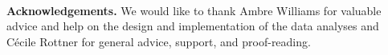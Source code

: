 \documentclass[runningheads]{llncs}
\begin{document}
\paragraph{}
\noindent\footnotesize{\textbf{Acknowledgements.}}
We would like to thank Ambre Williams for valuable advice and help on the design and implementation of the data analyses and C\'ecile Rottner for general advice, support, and proof-reading.

%
%
%


%
\end{document}
